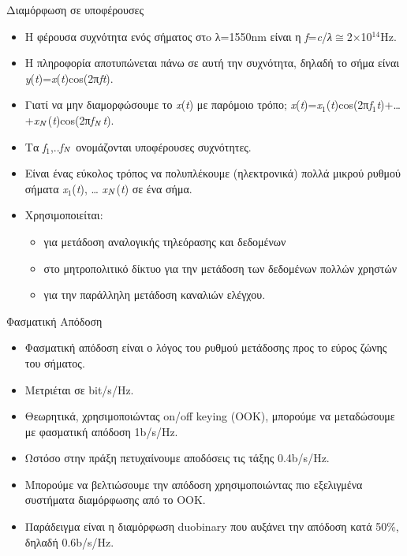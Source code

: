 \documentclass[11pt,aspectratio=169]{beamer}
\begin{document}
\begin{frame}[shrink=20,t]{Διαμόρφωση σε υποφέρουσες}
\begin{itemize}
\item Η φέρουσα συχνότητα ενός σήματος στo λ=1550nm είναι η \textit{f}=\textit{c}/\textit{λ}\textit{\ensuremath{\cong}}2\ensuremath{\times}10$^{14}$Hz.
\item H πληροφορία αποτυπώνεται πάνω σε αυτή την συχνότητα, δηλαδή το σήμα είναι \textit{y}(\textit{t})=\textit{x}(\textit{t})cos(2π\textit{ft}).
\item Γιατί να μην διαμορφώσουμε το \textit{x}(\textit{t}) με παρόμοιο τρόπο; \textit{x}(\textit{t})=\textit{x}$_{\text{1}}$(\textit{t})cos(2π\textit{f}$_{\text{1}}$\textit{t})+…+\textit{x}$_{\text{\textit{N}}}$(\textit{t})cos(2π\textit{f}$_{\text{\textit{N}}}$\textit{t}).
\item Τα \textit{f}$_{\text{1}}$,..\textit{f}$_{\text{\textit{N}}}$ ονομάζονται υποφέρουσες συχνότητες.
\item Είναι ένας εύκολος τρόπος να πολυπλέκουμε (ηλεκτρονικά) πολλά μικρού ρυθμού σήματα \textit{x}$_{\text{1}}$(\textit{t}), … \textit{x}$_{\text{\textit{N}}}$(\textit{t}) σε ένα σήμα.
\item Χρησιμοποιείται:
\begin{itemize}
\item για μετάδοση αναλογικής τηλεόρασης και δεδομένων
\item στο μητροπολιτικό δίκτυο για την μετάδοση των δεδομένων πολλών χρηστών
\item για την παράλληλη μετάδοση καναλιών ελέγχου.
\end{itemize}
\end{itemize}
\end{frame}

\begin{frame}[shrink=10,t]{Φασματική Απόδοση}
\begin{itemize}
\item Φασματική απόδοση είναι ο λόγος του ρυθμού μετάδοσης προς το εύρος ζώνης του σήματος.
\item Μετριέται σε bit/s/Hz.
\item Θεωρητικά, χρησιμοποιώντας on/off keying (OOK), μπορούμε να μεταδώσουμε με φασματική απόδοση 1b/s/Hz.
\item Ωστόσο στην πράξη πετυχαίνουμε αποδόσεις τις τάξης 0.4b/s/Hz.
\item Μπορούμε να βελτιώσουμε την απόδοση χρησιμοποιώντας πιο εξελιγμένα συστήματα διαμόρφωσης από το ΟΟΚ.
\item Παράδειγμα είναι η διαμόρφωση duobinary που αυξάνει την απόδοση κατά 50\%, δηλαδή 0.6b/s/Hz.
\end{itemize}
\end{frame}
\end{document}
